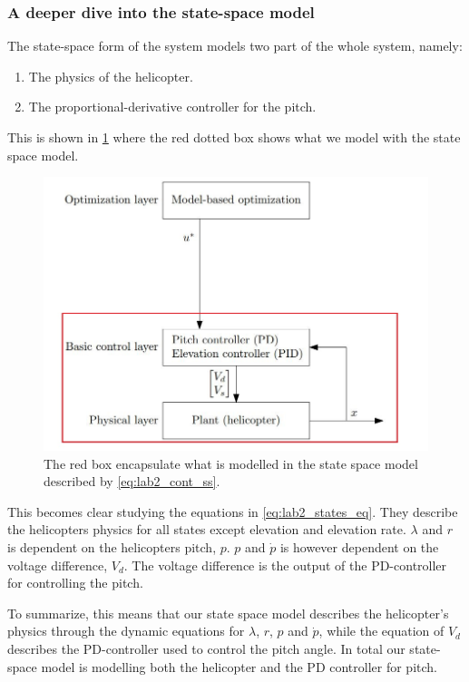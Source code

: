 \documentclass[../main.tex]{subfiles}
\begin{document}
\subsubsection{A deeper dive into the state-space model}
The state-space form of the system models two part of the whole system, namely: 
\begin{enumerate}
	\item The physics of the helicopter.
	\item The proportional-derivative controller for the pitch.
\end{enumerate}
This is shown in \cref{fig:lab2_system} where the red dotted box shows what we model with the state space model. 

\begin{figure}[h]
	\centering
	\includegraphics[width=0.8\linewidth]{figures/lab2_system}
	\caption{The red box encapsulate what is modelled in the state space model described by \cref{eq:lab2_cont_ss}.}
	\label{fig:lab2_system}
\end{figure}

This becomes clear studying the equations in \cref{eq:lab2_states_eq}. They describe the helicopters physics for all states except elevation and elevation rate. $ \lambda $ and $ r $ is dependent on the helicopters pitch, $ p $. $ p $ and $ \dot p  $ is however dependent on the voltage difference, $ V_d $. The voltage difference is the output of the PD-controller for controlling the pitch. 

To summarize, this means that our state space model describes the helicopter's physics through the dynamic equations for $ \lambda $, $ r $, $ p $ and $ \dot p $, while the equation of $ V_d $ describes the PD-controller used to control the pitch angle. In total our state-space model is modelling both the helicopter and the PD controller for pitch.
\end{document}
